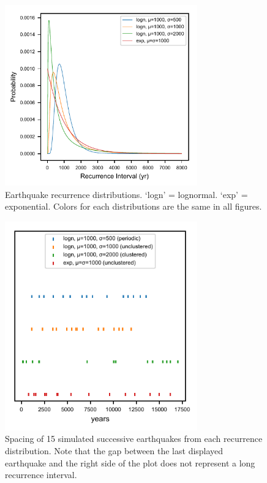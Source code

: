 \documentclass[se, manuscript]{copernicus}
\begin{document}






\clearpage

\begin{figure}[t]
\includegraphics[width=8.3cm]{./figures/recurrence_dists.pdf}
\caption{Earthquake recurrence distributions. `logn' = lognormal. `exp' = 
  exponential. Colors for each distributions are the same in all figures. 
  \label{eq_rec_dists}}
\end{figure}

\clearpage

\begin{figure}[t]
  \includegraphics[width=8.3cm]{./figures/event_spacing.pdf}
  \caption{Spacing of 15 simulated successive earthquakes from each recurrence 
  distribution. Note that the gap between the last displayed earthquake and the 
  right side of the plot does not represent a long recurrence interval. 
  \label{eq_spacing}}
\end{figure}
\end{document}
